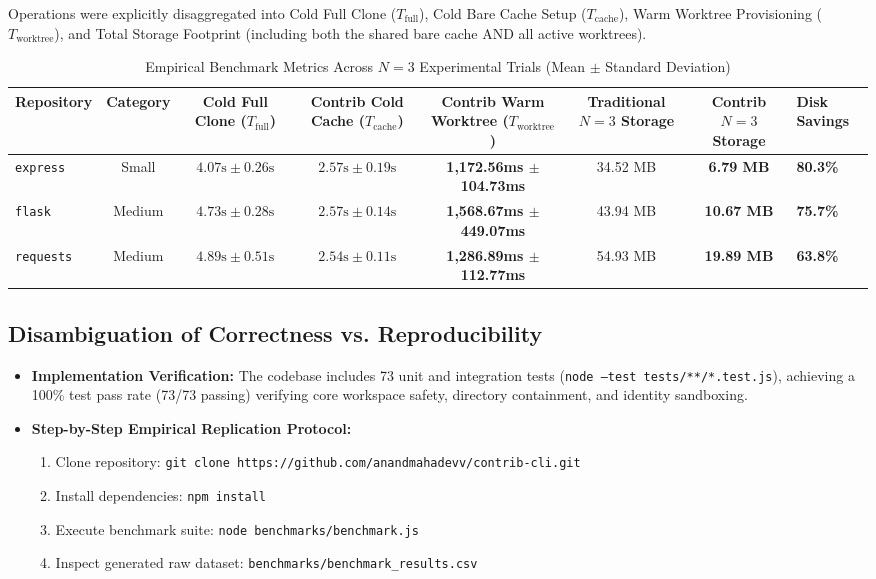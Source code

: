\documentclass[10pt,conference]{IEEEtran}
\begin{document}
Operations were explicitly disaggregated into Cold Full Clone ($T_{\text{full}}$), Cold Bare Cache Setup ($T_{\text{cache}}$), Warm Worktree Provisioning ($T_{\text{worktree}}$), and Total Storage Footprint (including both the shared bare cache AND all active worktrees).

\begin{table}[t]
\centering
\caption{Empirical Benchmark Metrics Across $N=3$ Experimental Trials (Mean $\pm$ Standard Deviation)}
\label{tab:benchmarks}
\begin{tabular}{lcccccc}
\toprule
\textbf{Repository} & \textbf{Category} & \textbf{Cold Full Clone ($T_{\text{full}}$)} & \textbf{Contrib Cold Cache ($T_{\text{cache}}$)} & \textbf{Contrib Warm Worktree ($T_{\text{worktree}}$)} & \textbf{Traditional $N=3$ Storage} & \textbf{Contrib $N=3$ Storage} & \textbf{Disk Savings} \\
\midrule
\texttt{express} & Small & $4.07\text{s} \pm 0.26\text{s}$ & $2.57\text{s} \pm 0.19\text{s}$ & \textbf{1,172.56ms $\pm$ 104.73ms} & 34.52 MB & \textbf{6.79 MB} & \textbf{80.3\%} \\
\texttt{flask} & Medium & $4.73\text{s} \pm 0.28\text{s}$ & $2.57\text{s} \pm 0.14\text{s}$ & \textbf{1,568.67ms $\pm$ 449.07ms} & 43.94 MB & \textbf{10.67 MB} & \textbf{75.7\%} \\
\texttt{requests} & Medium & $4.89\text{s} \pm 0.51\text{s}$ & $2.54\text{s} \pm 0.11\text{s}$ & \textbf{1,286.89ms $\pm$ 112.77ms} & 54.93 MB & \textbf{19.89 MB} & \textbf{63.8\%} \\
\bottomrule
\end{tabular}
\end{table}

\subsection{Disambiguation of Correctness vs. Reproducibility}
\begin{itemize}
    \item \textbf{Implementation Verification:} The codebase includes 73 unit and integration tests (\texttt{node --test tests/**/*.test.js}), achieving a 100\% test pass rate (73/73 passing) verifying core workspace safety, directory containment, and identity sandboxing.
    \item \textbf{Step-by-Step Empirical Replication Protocol:}
    \begin{enumerate}
        \item Clone repository: \texttt{git clone https://github.com/anandmahadevv/contrib-cli.git}
        \item Install dependencies: \texttt{npm install}
        \item Execute benchmark suite: \texttt{node benchmarks/benchmark.js}
        \item Inspect generated raw dataset: \texttt{benchmarks/benchmark\_results.csv}
    \end{enumerate}
\end{itemize}
\end{document}
